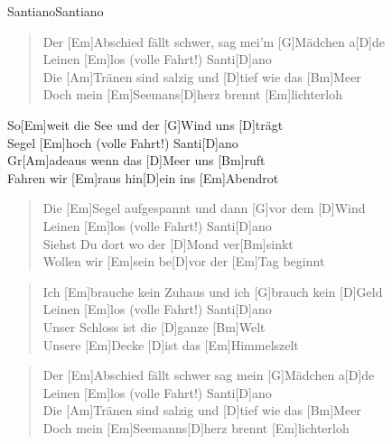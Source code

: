 \begin{song}{Santiano}{Santiano}

    \begin{verse}  
        Der [Em]Abschied fällt schwer, sag mei'm [G]Mädchen a[D]de \\
        Leinen [Em]los (volle Fahrt!) Santi[D]ano \\
        Die [Am]Tränen sind salzig und [D]tief wie das [Bm]Meer \\
        Doch mein [Em]Seemans[D]herz brennt [Em]lichterloh
    \end{verse}  

    \begin{chorus}
        So[Em]weit die See und der [G]Wind uns [D]trägt \\
        Segel [Em]hoch (volle Fahrt!) Santi[D]ano \\
        Gr[Am]adeaus wenn das [D]Meer uns [Bm]ruft \\
        Fahren wir [Em]raus hin[D]ein ins [Em]Abendrot
    \end{chorus}

    \begin{verse}  
        Die [Em]Segel aufgespannt und dann [G]vor dem [D]Wind \\
        Leinen [Em]los (volle Fahrt!) Santi[D]ano \\
        [Am]Siehst Du dort wo der [D]Mond ver[Bm]sinkt \\
        Wollen wir [Em]sein be[D]vor der [Em]Tag beginnt
    \end{verse}  


    \begin{verse}  
        Ich [Em]brauche kein Zuhaus und ich [G]brauch kein [D]Geld \\
        Leinen [Em]los (volle Fahrt!) Santi[D]ano \\
        [Am]Unser Schloss ist die [D]ganze [Bm]Welt \\
        Unsere [Em]Decke [D]ist das [Em]Himmelszelt
    \end{verse}  


    \begin{verse}  
        Der [Em]Abschied fällt schwer sag mein [G]Mädchen a[D]de \\
        Leinen [Em]los (volle Fahrt!) Santi[D]ano \\
        Die [Am]Tränen sind salzig und [D]tief wie das [Bm]Meer \\
        Doch mein [Em]Seemanns[D]herz brennt [Em]lichterloh
    \end{verse}  


\end{song}
